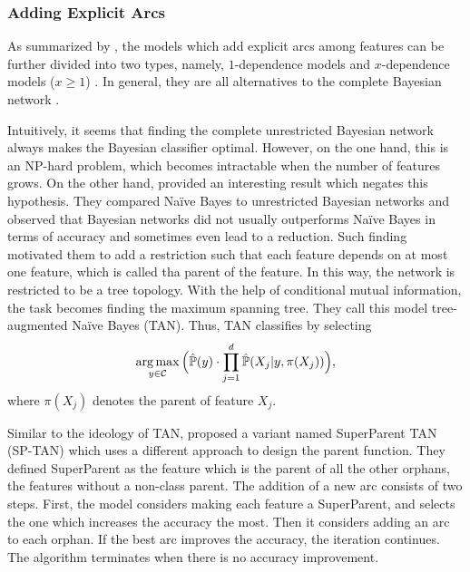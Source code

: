 \documentclass[twoside,11pt]{article}
\begin{document}
\subsubsection{Adding Explicit Arcs}
As summarized by \citet{zheng2005comparative}, the models which add explicit arcs among features can be further divided into two types, namely, $1$-dependence models \citet{friedman1997bayesian,keogh1999learning,webb2005not} and $x$-dependence models ($x\geq 1$) \citet{kohavi1996scaling,zheng2000lazy}. In general, they are all alternatives to the complete Bayesian network \citep{pearl2014probabilistic}.

Intuitively, it seems that finding the complete unrestricted Bayesian network always makes the Bayesian classifier optimal. However, on the one hand, this is an NP-hard problem, which becomes intractable when the number of features grows. On the other hand, \citet{friedman1997bayesian} provided an interesting result which negates this hypothesis. They compared Na\"ive Bayes to unrestricted Bayesian networks and observed that Bayesian networks did not usually outperforms Na\"ive Bayes in terms of accuracy and sometimes even lead to a reduction. Such finding motivated them to add a restriction such that each feature depends on at most one feature, which is called tha parent of the feature. In this way, the network is restricted to be a tree topology. With the help of conditional mutual information, the task becomes finding the maximum spanning tree. They call this model tree-augmented Na\"ive Bayes (TAN). Thus, TAN classifies by selecting
\begin{equation*}
    \centering
    \mathop{\arg\max}_{y\in\mathcal{C}}\Big(\hat{\mathbb{P}}(y)\cdot\prod_{j=1}^{d}\hat{\mathbb{P}}(X_j|y,\pi(X_j))\Big),
\end{equation*}
where $\pi(X_j)$ denotes the parent of feature $X_j$.

Similar to the ideology of TAN, \citet{keogh1999learning} proposed a variant named SuperParent TAN (SP-TAN) which uses a different approach to design the parent function. They defined SuperParent as the feature which is the parent of all the other orphans, the features without a non-class parent. The addition of a new arc consists of two steps. First, the model considers making each feature a SuperParent, and selects the one which increases the accuracy the most. Then it considers adding an arc to each orphan. If the best arc improves the accuracy, the iteration continues. The algorithm terminates when there is no accuracy improvement. 
\end{document}
